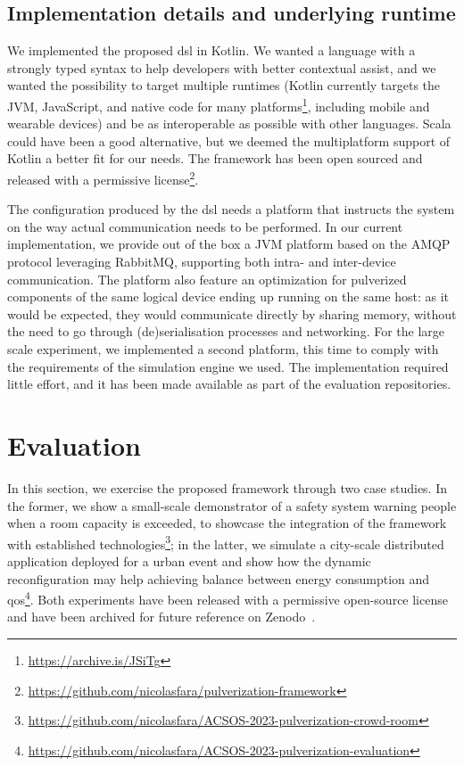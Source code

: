\documentclass[conference]{IEEEtran}
\begin{document}
\subsection{Implementation details and underlying runtime}

We implemented the proposed \ac{dsl} in Kotlin.
%
We wanted a language with a strongly typed syntax to help developers with better contextual assist,
and we wanted the possibility to target multiple runtimes
(Kotlin currently targets the JVM, JavaScript, and native code for many platforms\footnote{\url{https://archive.is/JSiTg}},
including mobile and wearable devices)
and be as interoperable as possible with other languages.
%
Scala could have been a good alternative,
but we deemed the multiplatform support of Kotlin a better fit for our needs.
%
The framework has been open sourced and released with a permissive license\footnote{\url{https://github.com/nicolasfara/pulverization-framework}}.

The configuration produced by the \ac{dsl} needs a platform that instructs the system on the way actual communication needs to be performed.
%
In our current implementation,
we provide out of the box a JVM platform based on the AMQP protocol leveraging RabbitMQ,
supporting both intra- and inter-device communication.
%
The platform also feature an optimization for pulverized components of the same logical device ending up running on the same host:
as it would be expected,
they would communicate directly by sharing memory,
without the need to go through (de)serialisation processes and networking.
%
For the large scale experiment,
we implemented a second platform,
this time to comply with the requirements of the simulation engine we used.
%
The implementation required little effort,
and it has been made available as part of the evaluation repositories.

\section{Evaluation}\label{sec:evaluation}

In this section,
we exercise the proposed framework through two case studies.
%
In the former,
we show a small-scale demonstrator of a safety system warning people when a room capacity is exceeded,
to showcase the integration of the framework with established technologies\footnote{
    \url{https://github.com/nicolasfara/ACSOS-2023-pulverization-crowd-room}
};
in the latter,
we simulate a city-scale distributed application deployed for a urban event
and show how the dynamic reconfiguration may help achieving balance between energy consumption and \ac{qos}\footnote{
    \url{https://github.com/nicolasfara/ACSOS-2023-pulverization-evaluation}
}.
%
Both experiments have been released with a permissive open-source license and have been archived for future reference on
Zenodo~\cite{https://doi.org/10.5281/zenodo.7933160, https://doi.org/10.5281/zenodo.7948801}.
\end{document}
